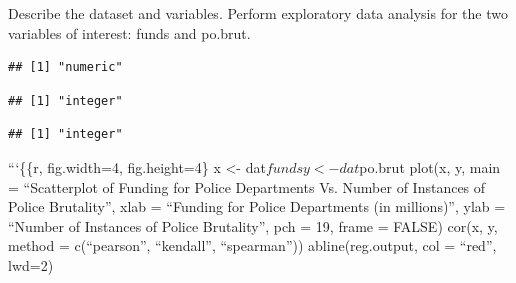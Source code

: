\documentclass[
]{article}
\newenvironment{Shaded}{\begin{snugshade}}{\end{snugshade}}
\newcommand{\AttributeTok}[1]{\textcolor[rgb]{0.77,0.63,0.00}{#1}}
\newcommand{\FunctionTok}[1]{\textcolor[rgb]{0.00,0.00,0.00}{#1}}
\newcommand{\NormalTok}[1]{#1}
\newcommand{\OtherTok}[1]{\textcolor[rgb]{0.56,0.35,0.01}{#1}}
\newcommand{\SpecialCharTok}[1]{\textcolor[rgb]{0.00,0.00,0.00}{#1}}
\newcommand{\StringTok}[1]{\textcolor[rgb]{0.31,0.60,0.02}{#1}}
\begin{document}
Describe the dataset and variables. Perform exploratory data analysis
for the two variables of interest: funds and po.brut.

\begin{Shaded}
\end{Shaded}

\begin{verbatim}
## [1] "numeric"
\end{verbatim}

\begin{Shaded}
\end{Shaded}

\begin{verbatim}
## [1] "integer"
\end{verbatim}

\begin{Shaded}
\end{Shaded}

\begin{verbatim}
## [1] "integer"
\end{verbatim}

\begin{Shaded}
\end{Shaded}

```\{\{r, fig.width=4, fig.height=4\} x \textless-
dat\(funds y <- dat\)po.brut plot(x, y, main = ``Scatterplot of Funding
for Police Departments Vs. Number of Instances of Police Brutality'',
xlab = ``Funding for Police Departments (in millions)'', ylab = ``Number
of Instances of Police Brutality'', pch = 19, frame = FALSE) cor(x, y,
method = c(``pearson'', ``kendall'', ``spearman'')) abline(reg.output,
col = ``red'', lwd=2)
\end{document}
